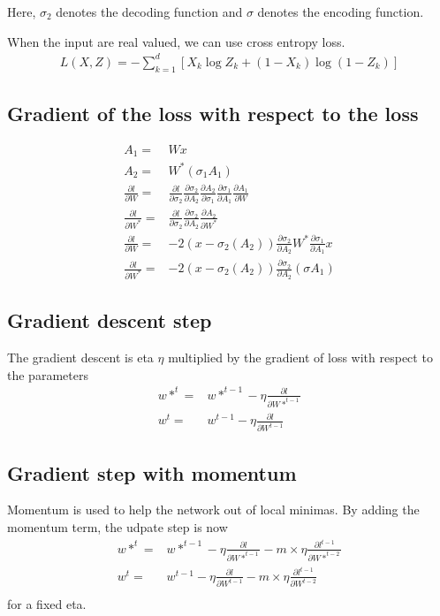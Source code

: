 \documentclass{article}
\begin{document}
Here, $\sigma_{2} $ denotes the decoding function and $ \sigma $ denotes the encoding function.

When the input are real valued, we can use cross entropy loss.
\begin{align*}
  L(X, Z) = -\sum_{k = 1}^{d} [X_{k}\log{Z_{k}} + (1-X_{k}) \log{(1 - Z_{k})} ]
\end{align*}

\subsection{Gradient of the loss with respect to the loss}
\begin{align*}
 A_1 = &Wx\\
 A_2 = &W^*(\sigma_1{A_1}) \\
\frac{\partial l}{\partial W} = & \frac{\partial l}{\partial \sigma_2}
\frac{\partial \sigma_2}{\partial A_2}
\frac{\partial A_2}{\partial \sigma_1}
\frac{\partial \sigma_1}{\partial A_1}\frac{\partial A_1}{\partial W}
\\
\frac{\partial l}{\partial W^*} = & \frac{\partial l}{\partial \sigma_2}
\frac{\partial \sigma_2}{\partial A_2}
\frac{\partial A_2}{\partial W^*} \\
\frac{\partial l}{\partial W} = & -2(x-\sigma_2(A_2))\frac{\partial \sigma_2}{\partial A_2}W^*\frac{\partial \sigma_1}{\partial A_1}x
\\
\frac{\partial l}{\partial W^*} = &-2(x-\sigma_2(A_2))\frac{\partial \sigma_2}{\partial A_2}(\sigma{A_1})
\end{align*}
\subsection{Gradient descent step}
The gradient descent is eta $\eta $ multiplied by the gradient of loss with respect to the parameters
\begin{align*}
 w*^{t} =& w*^{t-1} - \eta \frac{\partial l}{\partial W*^{t-1}}  \\
 w^{t} =& w^{t-1} - \eta \frac{\partial l}{\partial W^{t-1}}
\end{align*}
\subsection{Gradient step with momentum}
Momentum is used to help the network out of local minimas. By adding the momentum term, the udpate step is now
\begin{align*}
 w*^{t} =& w*^{t-1} - \eta \frac{\partial l}{\partial W*^{t-1}} - m \times \eta \frac{\partial l^{t-1}}{\partial W*^{t-2}} \\
 w^{t} =& w^{t-1} - \eta \frac{\partial l}{\partial W^{t-1}} - m \times \eta \frac{\partial l^{t-1}}{\partial W^{t-2}} \\
\end{align*}
for a fixed eta.
\end{document}
